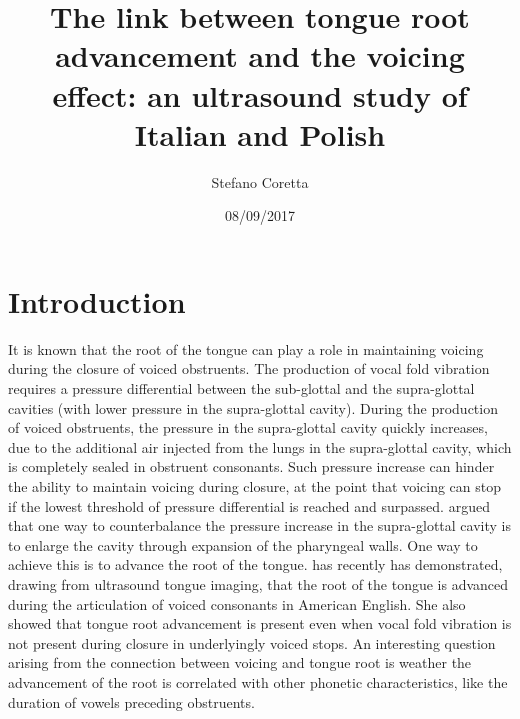 \documentclass[authoryear, twocolumn]{elsarticle}
\title{The link between tongue root advancement and the voicing effect: an
ultrasound study of Italian and Polish}
\author{Stefano Coretta}
\date{08/09/2017}
\begin{document}
\maketitle

\section{Introduction}\label{introduction}

It is known that the root of the tongue can play a role in maintaining
voicing during the closure of voiced obstruents. The production of vocal
fold vibration requires a pressure differential between the sub-glottal
and the supra-glottal cavities (with lower pressure in the supra-glottal
cavity). During the production of voiced obstruents, the pressure in the
supra-glottal cavity quickly increases, due to the additional air
injected from the lungs in the supra-glottal cavity, which is completely
sealed in obstruent consonants. Such pressure increase can hinder the
ability to maintain voicing during closure, at the point that voicing
can stop if the lowest threshold of pressure differential is reached and
surpassed. \citet{westbury1983} argued that one way to counterbalance
the pressure increase in the supra-glottal cavity is to enlarge the
cavity through expansion of the pharyngeal walls. One way to achieve
this is to advance the root of the tongue. \citet{ahn2016} has recently
has demonstrated, drawing from ultrasound tongue imaging, that the root
of the tongue is advanced during the articulation of voiced consonants
in American English. She also showed that tongue root advancement is
present even when vocal fold vibration is not present during closure in
underlyingly voiced stops. An interesting question arising from the
connection between voicing and tongue root is weather the advancement of
the root is correlated with other phonetic characteristics, like the
duration of vowels preceding obstruents.
\end{document}
